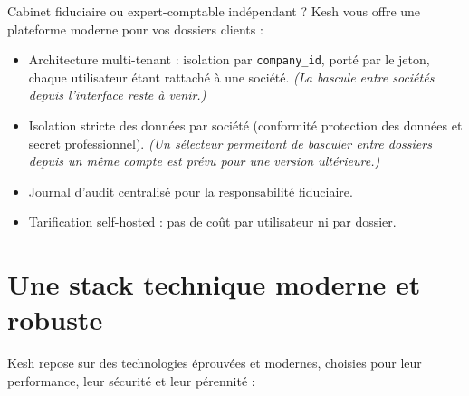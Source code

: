 \documentclass[a4paper,11pt,oneside]{article}
\begin{document}
\vspace{0.5cm}

\begin{tcolorbox}[%
    enhanced, breakable,
    colback=white, colframe=keshBorder,
    boxrule=0.5pt, arc=4pt%
]
\sffamily

\textbf{\large\color{keshPrimary}{\faBalanceScale\ Fiduciaire}}

\vspace{0.3cm}

Cabinet fiduciaire ou expert-comptable indépendant ? Kesh vous offre une plateforme moderne pour vos dossiers clients :

\begin{itemize}
    \item Architecture multi-tenant : isolation par \texttt{company\_id}, porté par le jeton, chaque utilisateur étant rattaché à une société. \emph{(La bascule entre sociétés depuis l'interface reste à venir.)}
    \item Isolation stricte des données par société (conformité protection des données et secret professionnel). \emph{(Un sélecteur permettant de basculer entre dossiers depuis un même compte est prévu pour une version ultérieure.)}
    \item Journal d'audit centralisé pour la responsabilité fiduciaire.
    \item Tarification self-hosted : pas de coût par utilisateur ni par dossier.
\end{itemize}

\end{tcolorbox}


\clearpage

\section*{\color{keshPrimary}Une stack technique moderne et robuste}

\vspace{0.5cm}

Kesh repose sur des technologies éprouvées et modernes, choisies pour leur performance, leur sécurité et leur pérennité :

\vspace{0.5cm}
\end{document}
